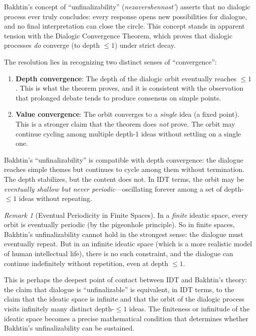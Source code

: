 \documentclass[11pt,openany]{book}
\theoremstyle{definition}
\theoremstyle{plain}
\theoremstyle{remark}
\newtheorem{remark}[axiom]{Remark}
\begin{document}
Bakhtin's concept of ``unfinalizability'' (\emph{nezavershennost'}) asserts that no dialogic process ever truly concludes: every response opens new possibilities for dialogue, and no final interpretation can close the circle. This concept stands in apparent tension with the Dialogic Convergence Theorem, which proves that dialogic processes \emph{do} converge (to depth $\leq 1$) under strict decay.

The resolution lies in recognizing two distinct senses of ``convergence'':

\begin{enumerate}
\item \textbf{Depth convergence}: The depth of the dialogic orbit eventually reaches $\leq 1$. This is what the theorem proves, and it is consistent with the observation that prolonged debate tends to produce consensus on simple points.

\item \textbf{Value convergence}: The orbit converges to a \emph{single} idea (a fixed point). This is a stronger claim that the theorem does \emph{not} prove. The orbit may continue cycling among multiple depth-1 ideas without settling on a single one.
\end{enumerate}

Bakhtin's ``unfinalizability'' is compatible with depth convergence: the dialogue reaches simple themes but continues to cycle among them without termination. The depth stabilizes, but the content does not. In IDT terms, the orbit may be \emph{eventually shallow but never periodic}---oscillating forever among a set of depth-$\leq 1$ ideas without repeating.

\begin{remark}[Eventual Periodicity in Finite Spaces]
In a \emph{finite} ideatic space, every orbit is eventually periodic (by the pigeonhole principle). So in finite spaces, Bakhtin's unfinalizability cannot hold in the strongest sense: the dialogue must eventually repeat. But in an infinite ideatic space (which is a more realistic model of human intellectual life), there is no such constraint, and the dialogue can continue indefinitely without repetition, even at depth $\leq 1$.

This is perhaps the deepest point of contact between IDT and Bakhtin's theory: the claim that dialogue is ``unfinalizable'' is equivalent, in IDT terms, to the claim that the ideatic space is infinite and that the orbit of the dialogic process visits infinitely many distinct depth-$\leq 1$ ideas. The finiteness or infinitude of the ideatic space becomes a precise mathematical condition that determines whether Bakhtin's unfinalizability can be sustained.
\end{remark}
\end{document}
